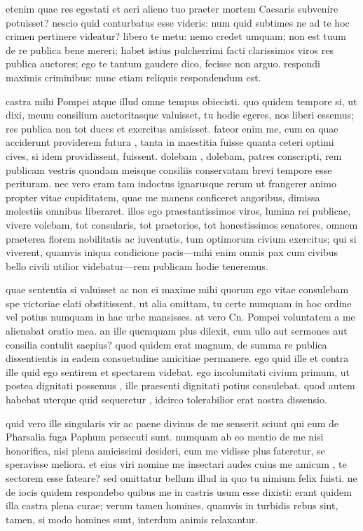  etenim quae res egestati et aeri alieno tuo praeter mortem Caesaris subvenire potuisset? nescio quid conturbatus esse videris: num quid subtimes ne ad te hoc crimen pertinere videatur? libero te metu: nemo credet umquam; non est tuum de re publica bene mereri; habet istius pulcherrimi facti clarissimos viros res publica auctores; ego te tantum gaudere dico, fecisse non arguo. respondi maximis criminibus: nunc etiam reliquis respondendum est.

 castra mihi Pompei atque illud omne tempus obiecisti. quo quidem tempore si, ut dixi, meum consilium auctoritasque valuisset, tu hodie egeres, nos liberi essemus; res publica non tot duces et exercitus amisisset. fateor enim me, cum ea quae acciderunt providerem futura , tanta in maestitia fuisse quanta ceteri optimi cives, si idem providissent, fuissent. dolebam , dolebam, patres conscripti, rem publicam vestris quondam meisque consiliis conservatam brevi tempore esse perituram. nec vero eram tam indoctus ignarusque rerum ut frangerer animo propter vitae cupiditatem, quae me manens conficeret angoribus, dimissa molestiis omnibus liberaret. illos ego praestantissimos viros, lumina rei publicae, vivere volebam, tot consularis, tot praetorios, tot honestissimos senatores, omnem praeterea florem nobilitatis ac iuventutis, tum optimorum civium exercitus; qui si viverent, quamvis iniqua condicione pacis—mihi enim omnis pax cum civibus bello civili utilior videbatur—rem publicam hodie teneremus.

 quae sententia si valuisset ac non ei maxime mihi quorum ego vitae consulebam spe victoriae elati obstitissent, ut alia omittam, tu certe numquam in hoc ordine vel potius numquam in hac urbe mansisses. at vero Cn. Pompei voluntatem a me alienabat oratio mea. an ille quemquam plus dilexit, cum ullo aut sermones aut consilia contulit saepius? quod quidem erat magnum, de summa re publica dissentientis in eadem consuetudine amicitiae permanere. ego quid ille et contra ille quid ego sentirem et spectarem videbat. ego incolumitati civium primum, ut postea dignitati possemus , ille praesenti dignitati potius consulebat. quod autem habebat uterque quid sequeretur , idcirco tolerabilior erat nostra dissensio.

 quid vero ille singularis vir ac paene divinus de me senserit sciunt qui eum de Pharsalia fuga Paphum persecuti sunt. numquam ab eo mentio de me nisi honorifica, nisi plena amicissimi desideri, cum me vidisse plus fateretur, se speravisse meliora. et eius viri nomine me insectari audes cuius me amicum , te sectorem esse fateare? sed omittatur bellum illud in quo tu nimium felix fuisti. ne de iocis quidem respondebo quibus me in castris usum esse dixisti: erant quidem illa castra plena curae; verum tamen homines, quamvis in turbidis rebus sint, tamen, si modo homines sunt, interdum animis relaxantur.


